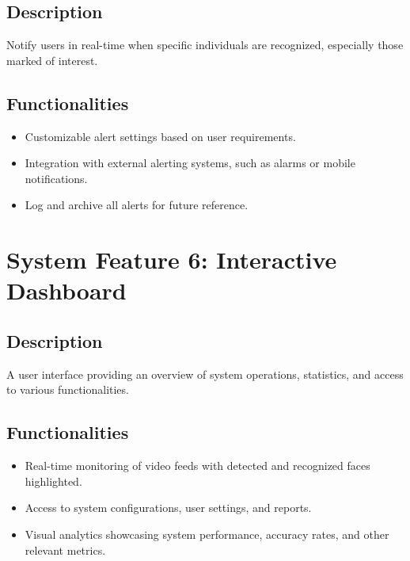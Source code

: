 \documentclass{scrreprt}
\begin{document}
                    \subsection{Description}
                    Notify users in real-time when specific individuals are recognized, especially those marked of interest.
                    \subsection{Functionalities}
                        \begin{itemize}
                            \item Customizable alert settings based on user requirements.
                            \item Integration with external alerting systems, such as alarms or mobile notifications.
                            \item Log and archive all alerts for future reference.         
                        \end{itemize}

                        \section{System Feature 6: Interactive Dashboard}   
                        \subsection{Description}
                        A user interface providing an overview of system operations, statistics, and access to various functionalities.
                        \subsection{Functionalities}
                            \begin{itemize}
                                \item Real-time monitoring of video feeds with detected and recognized faces highlighted.
                                \item Access to system configurations, user settings, and reports.
                                \item Visual analytics showcasing system performance, accuracy rates, and other relevant metrics.       
                            \end{itemize}
    
\end{document}
